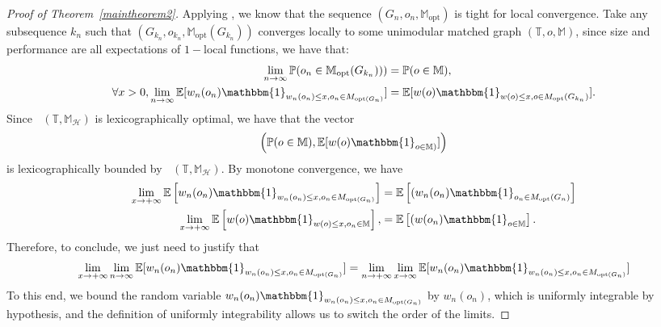 \documentclass[11pt]{article}
\DeclareMathOperator{\perfE}{perf_E}
\begin{document}
\begin{proof}[Proof of Theorem~\ref{maintheorem2}]
Applying \cite[Lemma~4.2]{enriquez2024optimalunimodularmatching},
we know that the sequence $(G_n,o_n,\mathbb{M}_{\mathrm{opt}})$ is tight for local convergence.
Take any subsequence $k_n$ such that $(G_{k_n},o_{k_n},\mathbb{M}_{\mathrm{opt}}(G_{k_n}))$ converges locally to some unimodular matched graph $(\mathbb{T},o,\mathbb{M})$, since size and performance are all expectations of $1-$local functions, we have that:
\begin{align*}
    \lim_{n \rightarrow \infty} \mathbb{P}(o_n \in \mathbb{M}_{\mathrm{opt}}(G_{k_n})))&=\mathbb{P}(o\in \mathbb{M}), \\
    \forall x>0, \lim_{n \rightarrow \infty} \mathbb{E}[w_n(o_n)\mathbbm{1}_{w_n(o_n)\leq x, o_n \in M_{\mathrm{opt}(G_n)}}] &= \mathbb{E}[w(o)\mathbbm{1}_{w(o)\leq x, o \in M_\mathrm{opt}(G_{k_n})}]. \\    
\end{align*}
Since $\perfE(\mathbb{T},\mathbb{M}_{\mathcal{H}})$ is lexicographically optimal, we have that the vector
\[  \left(\mathbb{P}(o \in \mathbb{M}), \mathbb{E}[w(o)\mathbbm{1}_{ o \in \mathbb{M})}] \right) \]
is lexicographically bounded by $\perfE(\mathbb{T},\mathbb{M}_{\mathcal{H}})$.
By monotone convergence, we have 
\begin{align*}
 \lim_{x \rightarrow +\infty} \mathbb{E}\left[w_n(o_n)\mathbbm{1}_{w_n(o_n)\leq x, o_n \in M_{\mathrm{opt}(G_n)}}\right] &=\mathbb{E}\left[(w_n(o_n)\mathbbm{1}_{o_n \in M_{\mathrm{opt}}(G_n)}\right] \\
 \lim_{x \rightarrow +\infty} \mathbb{E}\left[w(o)\mathbbm{1}_{w(o)\leq x, o_n \in \mathbb{M}}\right], &=\mathbb{E}\left[(w(o_n)\mathbbm{1}_{o \in \mathbb{M}}\right]. 
\end{align*}
Therefore, to conclude, we just need to justify that
\[ \lim_{x \rightarrow +\infty}\lim_{n \rightarrow \infty} \mathbb{E}[w_n(o_n)\mathbbm{1}_{w_n(o_n)\leq x, o_n \in M_{\mathrm{opt}(G_n)}}] =\lim_{n \rightarrow +\infty}\lim_{x \rightarrow \infty} \mathbb{E}[w_n(o_n)\mathbbm{1}_{w_n(o_n)\leq x, o_n \in M_{\mathrm{opt}(G_n)}}] \]
To this end, we bound the random variable
$w_n(o_n)\mathbbm{1}_{w_n(o_n)\leq x, o_n \in M_{\mathrm{opt}(G_n)}}$ by $w_n(o_n)$, which is uniformly integrable by hypothesis, and the definition of uniformly integrability allows us to switch the order of the limits.




\end{proof}
\end{document}
